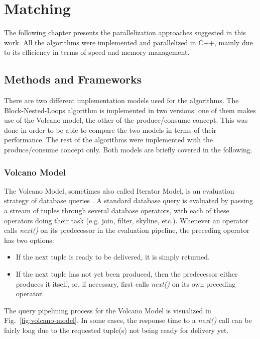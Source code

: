 \chapter{Matching} \label{chapter:matching}
The following chapter presents the parallelization approaches suggested in this work. %
All the algorithms were implemented and parallelized in C++, mainly due to its efficiency in terms of speed and memory management. 

\section{Methods and Frameworks} \label{section:methods-frameworks}
There are two different implementation models used for the algorithms. The Block-Nested-Loops algorithm is implemented in two versions: one of them makes use of the Volcano model, the other of the produce/consume concept. This was done in order to be able to compare the two models in terms of their performance. The rest of the algorithms were implemented with the produce/consume concept only. Both models are briefly covered in the following. 

\subsection{Volcano Model}
The Volcano Model, sometimes also called Iterator Model, is an evaluation strategy of database queries \cite{volcano-wiki}. A standard database query is evaluated by passing a stream of tuples through several database operators, with each of these operators doing their task (e.g. join, filter, skyline, etc.). Whenever an operator calls \textit{next()} on its predecessor in the evaluation pipeline, the preceding operator has two options: 
\begin{itemize}
	\item If the next tuple is ready to be delivered, it is simply returned. 
	\item If the next tuple has not yet been produced, then the predecessor either produces it itself, or, if necessary, first calls \textit{next()} on its own preceding operator. 
\end{itemize}
The query pipelining process for the Volcano Model is visualized in Fig.~\ref{fig:volcano-model}. In some cases, the response time to a \textit{next()} call can be fairly long due to the requested tuple(s) not being ready for delivery yet. %


